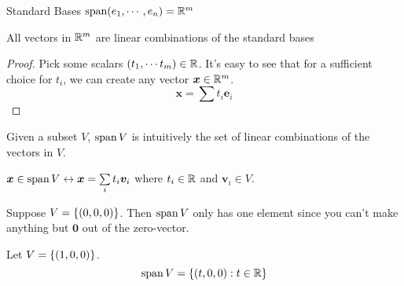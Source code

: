 \documentclass[11pt]{article}
\begin{document}
\begin{theorem}{Standard Bases}
  $\operatorname{span} (e_1, \cdots, e_n) = \mathbb R^m$
  
  All vectors in $\mathbb R^m$ are linear combinations of the standard bases
  \begin{proof}
    Pick some scalars $\left ( t_1, \cdots t_m \right) \in \mathbb R$.
    It's easy to see that for a sufficient choice for $t_i$, we can create any vector $\bm{x} \in \mathbb{R}^m$.
    $$
    \bm{x} = \sum t_i \bm{e}_i
    $$
  \end{proof}
\end{theorem}








Given a subset $V$, $\operatorname{span} V$ is intuitively the set of linear combinations of the vectors in $V$.

$\bm{x} \in \operatorname{span} V \leftrightarrow \bm{x} = \sum \limits_i t_i \bm{v}_i$ where $t_i \in \mathbb R$ and $\bm{v}_i \in V$.



\begin{example}
  
  Suppose $V = \left \{ \left ( 0, 0, 0 \right) \right \}$.
  Then $\operatorname{span} V$ only has one element since you can't make anything but $\bm{0}$ out of the zero-vector.
\end{example}

\begin{example}

  Let $V = \left \{ \left ( 1, 0, 0 \right) \right \}$.
  $$
  \operatorname{span} V = \left \{ \left ( t, 0, 0 \right) : t \in \mathbb R \right \}
  $$
\end{example}
\end{document}
